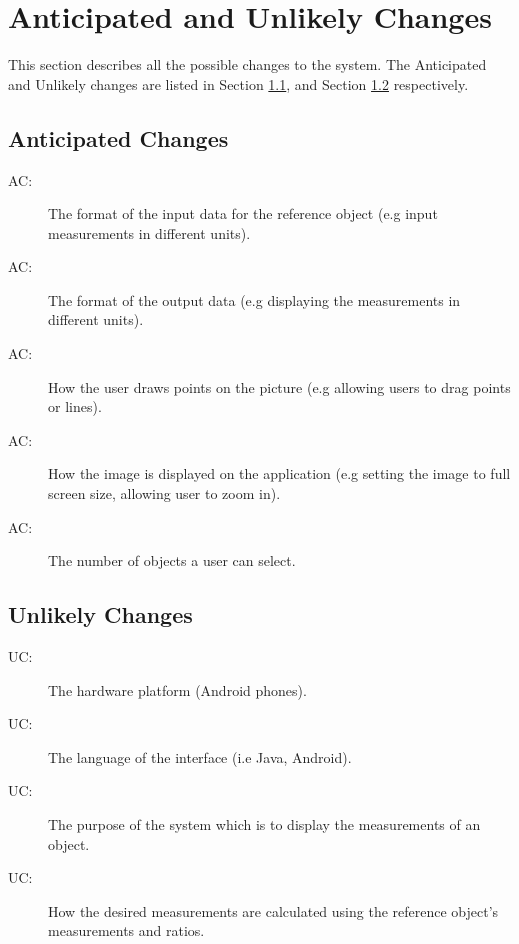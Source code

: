 \documentclass[12pt, titlepage]{article}
\newcounter{acnum}
\newcommand{\actheacnum}{AC\theacnum}
\newcounter{ucnum}
\newcommand{\uctheucnum}{UC\theucnum}
\begin{document}
\section{Anticipated and Unlikely Changes} \label{SecChange}

This section describes all the possible changes to the system. The Anticipated and Unlikely changes are listed in Section \ref{SecAchange}, and Section \ref{SecUchange} respectively.

\subsection{Anticipated Changes} \label{SecAchange}

\begin{description}
\item[ \actheacnum \label{acInput}:] The format of the input data for the reference object (e.g input measurements in different units).
\item[ \actheacnum \label{acOutput}:] The format of the output data (e.g displaying the measurements in different units).
\item[ \actheacnum \label{acDraw}:] How the user draws points on the picture (e.g allowing users to drag points or lines).
\item[ \actheacnum \label{acImage}:] How the image is displayed on the application (e.g setting the image to full screen size, allowing user to zoom in).
\item[ \actheacnum \label{acObject}:]The number of objects a user can select.

\end{description}

\subsection{Unlikely Changes} \label{SecUchange}

\begin{description}
\item[ \uctheucnum \label{ucHardware}:] The hardware platform (Android phones).
\item[ \uctheucnum \label{ucLanguage}:] The language of the interface (i.e Java, Android).
\item[ \uctheucnum \label{ucPurpose}:] The purpose of the system which is to display the measurements of an object.
\item[ \uctheucnum \label{ucCalculate}:] How the desired measurements are calculated using the reference object's measurements and ratios.

\end{description}
\end{document}
